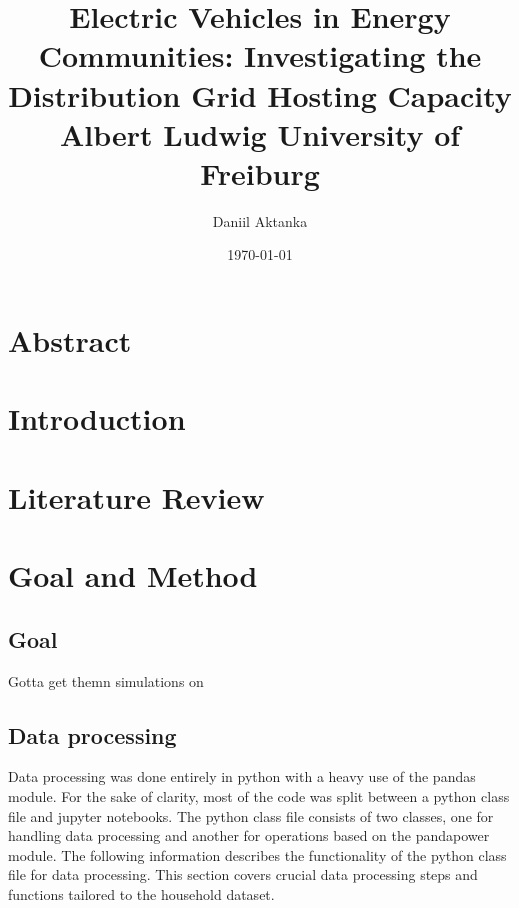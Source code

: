 \documentclass[a4paper,10pt]{report}
\begin{document}
\title{
	\vspace{2cm}
	{\LARGE Electric Vehicles in Energy Communities:}
	{\Large Investigating the Distribution Grid Hosting Capacity} \\[2cm]
	{\large Albert Ludwig University of Freiburg}
}
\author{
	\Large Daniil Aktanka
}
\date{
	\normalsize \today
}
\maketitle
\thispagestyle{empty}


\chapter*{Abstract}

\tableofcontents
\cleardoublepage
{}


\chapter{Introduction}
\chapter{Literature Review}
\chapter{Goal and Method}
\section{Goal}
Gotta get themn simulations on



\section{Data processing}
Data processing was done entirely in python with a heavy use of the pandas module. For the sake of clarity, most of the code was split between a python class file and jupyter notebooks. The python class file consists of two classes, one for handling data processing and another for operations based on the pandapower module. The following information describes the functionality of the python class file for data processing. This section covers crucial data processing steps and functions tailored to the household dataset. 
\end{document}
